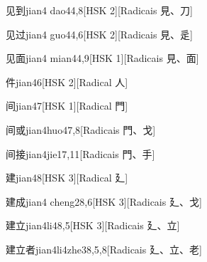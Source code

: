 \begin{entry}{见到}{jian4 dao4}{4,8}[HSK 2][Radicais ⾒、⼑]
\end{entry}

\begin{entry}{见过}{jian4 guo4}{4,6}[HSK 2][Radicais ⾒、⾡]
\end{entry}

\begin{entry}{见面}{jian4 mian4}{4,9}[HSK 1][Radicais ⾒、⾯]
\end{entry}

\begin{entry}{件}{jian4}{6}[HSK 2][Radical ⼈]
\end{entry}

\begin{entry}{间}{jian4}{7}[HSK 1][Radical ⾨]
\end{entry}

\begin{entry}{间或}{jian4huo4}{7,8}[Radicais ⾨、⼽]
\end{entry}

\begin{entry}{间接}{jian4jie1}{7,11}[Radicais ⾨、⼿]
\end{entry}

\begin{entry}{建}{jian4}{8}[HSK 3][Radical ⼵]
\end{entry}

\begin{entry}{建成}{jian4 cheng2}{8,6}[HSK 3][Radicais ⼵、⼽]
\end{entry}

\begin{entry}{建立}{jian4li4}{8,5}[HSK 3][Radicais ⼵、⽴]
\end{entry}

\begin{entry}{建立者}{jian4li4zhe3}{8,5,8}[Radicais ⼵、⽴、⽼]
\end{entry}

